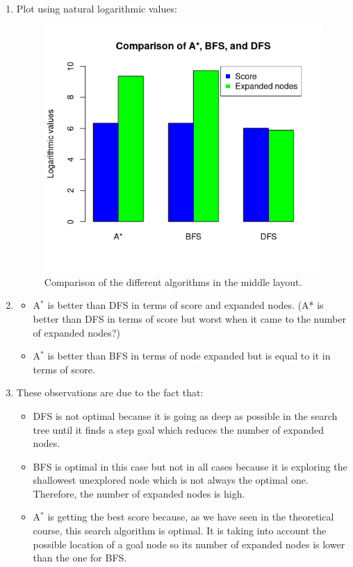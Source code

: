 \documentclass{article}
\begin{document}
\begin{enumerate}[label=\alph*.,leftmargin=1.35em]
    \item Plot using natural logarithmic values:\\
    \begin{figure}[H]
        \centering
        \includegraphics[scale=0.7]{q4_plot.png} 
        \caption{Comparison of the different algorithms in the middle layout.}
    \end{figure}
    \item
        \begin{itemize}
            \item A$^*$ is better than DFS in terms of score and expanded nodes. (A* is better than DFS in terms of score but worst when it came to the number of expanded nodes?)
            \item A$^*$ is better than BFS in terms of node expanded but is equal to it in terms of score.
        \end{itemize}
    \item These observations are due to the fact that:
        \begin{itemize}
            \item DFS is not optimal because it is going as deep as possible in the search tree until it finds a step goal which reduces the number of expanded nodes.
            \item BFS is optimal in this case but not in all cases because it is exploring the shallowest unexplored node which is not always the optimal one. Therefore, the number of expanded nodes is high.
            \item A$^*$ is getting the best score because, as we have seen in the theoretical course, this search algorithm is optimal. It is taking into account the possible location of a goal node so its number of expanded nodes is lower than the one for BFS.
        \end{itemize}
\end{enumerate}


\end{document}
